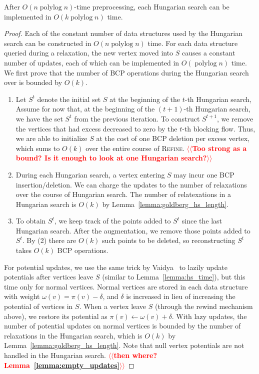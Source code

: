 \documentclass[a4paper,UKenglish]{socg-lipics-v2018}
\makeatletter
\def\note#1{\textcolor{red}{{#1}}}
\def\polylog{\mathop{\mathrm{polylog}}}
\def\fsupply{\phi}
\theoremstyle{plain}
\numberwithin{figure}{section}
\def\n@te#1{\textsf{\boldmath \textbf{$\langle\!\langle$#1$\rangle\!\rangle$}}\leavevmode}
\def\note#1{\textcolor{red}{\n@te{#1}}}
\makeatother
\begin{document}
\begin{lemmarep}
\label{lemma:goldberg_hs_time}
After $O(n \polylog n)$-time preprocessing,
each Hungarian search can be implemented in $O(k \polylog n)$ time.
\end{lemmarep}
%
\begin{proof}
Each of the constant number of data structures used by the Hungarian search can be constructed in $O(n\polylog n)$ time.
For each data structure queried during a relaxation,
the new vertex moved into $S$ causes a constant number of updates, each of which can be implemented in $O(\polylog n)$ time.
%
We first prove that the number of BCP
operations during the Hungarian search over %
is bounded by $O(k)$.

\begin{enumerate}
\item Let $S^t$ denote the initial set $S$ at the beginning of the $t$-th Hungarian search,
Assume for now that, at the beginning of the $(t+1)$-th Hungarian search, we have the set $S^t$ from the previous iteration.
To construct $S^{t+1}$, we remove the vertices that had excess decreased to zero by the $t$-th blocking flow.
Thus, we are able to initialize $S$ at the cost of one BCP deletion per excess vertex, which sums to $O(k)$ over the entire course of \textsc{Refine}.  \note{Too strong as a bound? Is it enough to look at one Hungarian search?}

\item During each Hungarian search, a vertex entering $S$ may incur one BCP insertion/deletion.
We can charge the updates to the number of relaxations over the course of Hungarian search.
The number of relatexations in a Hungarian search is $O(k)$ by Lemma~\ref{lemma:goldberg_hs_length}.

\item To obtain $S^t$, we keep track of the points added to $S^t$ since the last Hungarian search.  After the augmentation, we remove those points added to $S^t$.  By (2) there are $O(k)$ such points to be deleted, so reconstructing $S^t$ takes $O(k)$ BCP operations.
\end{enumerate}

For potential updates, we use the same trick by Vaidya~\cite{Vaidya89} to
lazily update potentials after vertices leave $S$ (similar to Lemma~\ref{lemma:hs_time}), but this time only for normal vertices.
Normal vertices are stored in each data structure with weight
$\omega(v) = \pi(v) - \delta$, and $\delta$ is increased in lieu of increasing
the potential of vertices in $S$.
When a vertex leave $S$ (through the rewind mechanism above), we restore
its potential as $\pi(v) \gets \omega(v) + \delta$.
With lazy updates, the number of potential updates on normal vertices is
bounded by the number of relaxations in the Hungarian search, which is $O(k)$ by Lemma~\ref{lemma:goldberg_hs_length}.
Note that null vertex potentials are not handled in the Hungarian search. \note{then where? Lemma~\ref{lemma:empty_updates}}
\end{proof}
\end{document}
